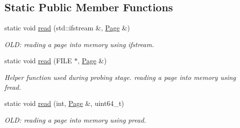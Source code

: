 \subsection*{Static Public Member Functions}
\begin{DoxyCompactItemize}
\item 
\hypertarget{class_page_a0e7f5ba909c41e17244a8ed088aeb4ff}{}static void \hyperlink{class_page_a0e7f5ba909c41e17244a8ed088aeb4ff}{read} (std\+::ifstream \&, \hyperlink{class_page}{Page} \&)\label{class_page_a0e7f5ba909c41e17244a8ed088aeb4ff}

\begin{DoxyCompactList}\small\item\em O\+L\+D\+: reading a page into memory using ifstream. \end{DoxyCompactList}\item 
\hypertarget{class_page_a48f4f99d2d0b353225494b83e9a2b133}{}static void \hyperlink{class_page_a48f4f99d2d0b353225494b83e9a2b133}{read} (F\+I\+L\+E $\ast$, \hyperlink{class_page}{Page} \&)\label{class_page_a48f4f99d2d0b353225494b83e9a2b133}

\begin{DoxyCompactList}\small\item\em Helper function used during probing stage. reading a page into memory using fread. \end{DoxyCompactList}\item 
\hypertarget{class_page_abcbc613bc9b2cc7ca90b8ef89b2e996f}{}static void \hyperlink{class_page_abcbc613bc9b2cc7ca90b8ef89b2e996f}{read} (int, \hyperlink{class_page}{Page} \&, uint64\+\_\+t)\label{class_page_abcbc613bc9b2cc7ca90b8ef89b2e996f}

\begin{DoxyCompactList}\small\item\em O\+L\+D\+: reading a page into memory using pread. \end{DoxyCompactList}\end{DoxyCompactItemize}
